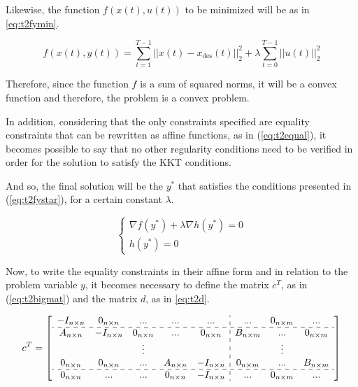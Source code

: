 Likewise, the function $f(x(t), u(t))$ to be minimized will be as in \eqref{eq:t2fymin}.

\begin{equation}
\label{eq:t2fymin}
    f(x(t),y(t)) = \sum_{t=1}^{T-1} ||x(t) - x_{\text{des}}(t)||_2^2 + \lambda \sum_{t=0}^{T-1} ||u(t)||_2^2
\end{equation}

Therefore, since the function $f$ is a sum of squared norms, it will be a convex function and therefore, the problem is a convex problem.

In addition, considering that the only constraints specified are equality constraints that can be rewritten as affine functions, as in (\ref{eq:t2equal}), it becomes possible to say that no  other regularity conditions need to be verified in order for the solution to satisfy the KKT conditions.

And so, the final solution will be the $y^*$ that satisfies the conditions presented in (\ref{eq:t2fystar}), for a certain constant $\lambda$.

\begin{equation}
\label{eq:t2fystar}
\begin{cases}
	\nabla f(y^*) + \lambda \nabla h(y^*) = 0 \\
	h(y^*) = 0
\end{cases}
\end{equation}

Now, to write the equality constraints in their affine form and in relation to the problem variable $y$, it becomes necessary to define the matrix $c^T$, as in (\ref{eq:t2bigmat}) and the matrix $d$, as in \eqref{eq:t2d}.

\begin{equation}
\label{eq:t2bigmat}
c^T =
\left[
\begin{array}{c c c c c : c c c}
-I_{n\times n}  & 0_{n \times n} & ... & ... & ... & ... & 0_{n \times m} & ... \\ \hdashline
A_{n\times n} & -I_{n\times n} & 0_{n\times n} & ... & 0_{n\times n} & B_{n\times m} &...& 0_{n\times m} \\
\ & \ & \vdots & \ & \ & \ & \vdots & \ \\
0_{n \times n} & 0_{n \times n} & ... & A_{n \times n} & -I_{n \times n} & 0_{n \times m} & ... & B_{n \times m} \\ \hdashline
0_{n\times n} & ... & ... & 0_{n\times n} & - I_{n \times n} & ... & 0_{n \times m} & ... \\
\end{array}
\right]
\end{equation}

